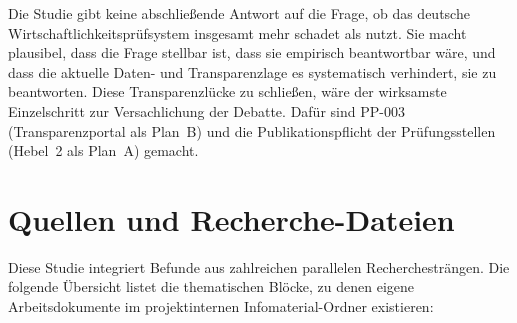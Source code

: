 \documentclass{umbruch-position}
\begin{document}
Die Studie gibt keine abschließende Antwort auf die Frage, ob das deutsche Wirtschaftlichkeitsprüfsystem insgesamt mehr schadet als nutzt. Sie macht plausibel, dass die Frage stellbar ist, dass sie empirisch beantwortbar wäre, und dass die aktuelle Daten- und Transparenz\-lage es systematisch verhindert, sie zu beantworten. Diese Transparenz\-lücke zu schließen, wäre der wirksamste Einzelschritt zur Versachlichung der Debatte. Dafür sind PP-003 (Transparenz\-portal als Plan~B) und die Publikations\-pflicht der Prüfungs\-stellen (Hebel~2 als Plan~A) gemacht.


\section{Quellen und Recherche-Dateien}

Diese Studie integriert Befunde aus zahlreichen parallelen Recherchesträngen. Die folgende Übersicht listet die thematischen Blöcke, zu denen eigene Arbeitsdokumente im projektinternen Infomaterial-Ordner existieren:
\end{document}
